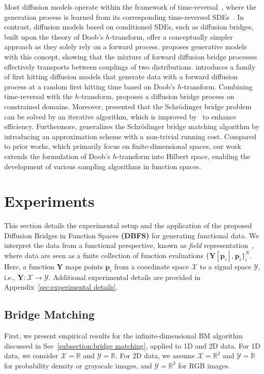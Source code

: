 \documentclass[nohyperref]{article}
\theoremstyle{plain}
\theoremstyle{remark}
\newcommand{\mc}{\mathcal}
\newcommand{\mb}{\mathbf}
\begin{document}
Most diffusion models operate within the framework of time-reversal~\citep{ANDERSON1982313}, where the generation process is learned from its corresponding time-reversed SDEs~\citep{song2021scorebased}. In contrast, diffusion models based on conditioned SDEs, such as diffusion bridges, built upon the theory of Doob's $h$-transform, offer a conceptually simpler approach as they solely rely on a forward process. \citep{peluchetti2022nondenoising} proposes generative models with this concept, showing that the mixture of forward diffusion bridge processes effectively transports between couplings of two distributions. \citep{ye2022first} introduces a family of first hitting diffusion models that generate data with a forward diffusion process at a random first hitting time based on Doob's $h$-transform. Combining time-reversal with the $h$-transform, \citep{liu2023learning} proposes a diffusion bridge process on constrained domains. Moreover, \citep{shi2024diffusion, peluchetti2023diffusion} presented that the Schrödinger bridge problem can be solved by an iterative algorithm, which is improved by~\citep{debortoli2024schr} to enhance efficiency. Furthermore, \citep{liu2024generalized} generalizes the Schrödinger bridge matching algorithm by introducing an approximation scheme with a non-trivial running cost. Compared to prior works, which primarily focus on finite-dimensional spaces, our work extends the formulation of Doob's $h$-transform into Hilbert space, enabling the development of various sampling algorithms in function spaces.
\section{Experiments}


This section details the experimental setup and the application of the proposed Diffusion Bridges in Function Spaces \textbf{(DBFS)} for generating functional data. We interpret the data from a functional perspective, known as \textit{field} representation~\citep{xie2022neural,zhuang2023diffusion}, where data are seen as a finite collection of function evaluations $\{\mb{Y}[\mb{p}_i], \mb{p}_i\}_i^{N}$. Here, a function $\mb{Y}$ maps points $\mb{p}_i$ from a coordinate space $\mc{X}$ to a signal space $\mc{Y}$, i.e., $\mb{Y} : \mc{X} \to \mc{Y}$. Additional experimental details are provided in Appendix~\ref{sec:experimental details}.

\subsection{Bridge Matching}
First, we present empirical results for the infinite-dimensional BM algorithm discussed in Sec~\ref{subsection:bridge matching}, applied to 1D and 2D data. For 1D data, we consider $\mc{X} = \mathbb{R}$ and $\mc{Y} = \mathbb{R}$. For 2D data, we assume $\mc{X} = \mathbb{R}^2$ and $\mc{Y} = \mathbb{R}$ for probability density or grayscale images, and $\mc{Y} = \mathbb{R}^3$ for RGB images.
\end{document}
